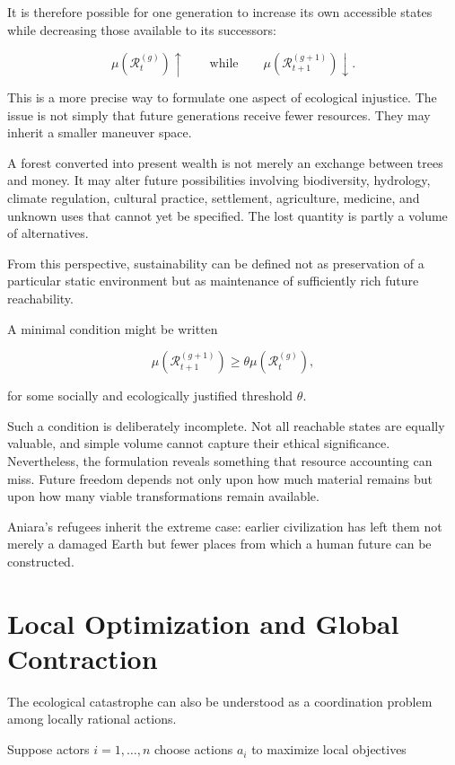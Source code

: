 \documentclass[11pt,oneside]{book}
\theoremstyle{definition}
\theoremstyle{remark}
\newcommand{\R}{\mathcal{R}}
\begin{document}
It is therefore possible for one generation to increase its own accessible states while decreasing those available to its successors:

\[
\mu\!\left(
\R_t^{(g)}
\right)\uparrow
\qquad\text{while}\qquad
\mu\!\left(
\R_{t+1}^{(g+1)}
\right)\downarrow.
\]

This is a more precise way to formulate one aspect of ecological injustice. The issue is not simply that future generations receive fewer resources. They may inherit a smaller maneuver space.

A forest converted into present wealth is not merely an exchange between trees and money. It may alter future possibilities involving biodiversity, hydrology, climate regulation, cultural practice, settlement, agriculture, medicine, and unknown uses that cannot yet be specified. The lost quantity is partly a volume of alternatives.

From this perspective, sustainability can be defined not as preservation of a particular static environment but as maintenance of sufficiently rich future reachability.

A minimal condition might be written

\[
\mu\!\left(
\R_{t+1}^{(g+1)}
\right)
\geq
\theta
\mu\!\left(
\R_t^{(g)}
\right),
\]

for some socially and ecologically justified threshold \(\theta\).

Such a condition is deliberately incomplete. Not all reachable states are equally valuable, and simple volume cannot capture their ethical significance. Nevertheless, the formulation reveals something that resource accounting can miss. Future freedom depends not only upon how much material remains but upon how many viable transformations remain available.

Aniara's refugees inherit the extreme case: earlier civilization has left them not merely a damaged Earth but fewer places from which a human future can be constructed.

\section{Local Optimization and Global Contraction}

The ecological catastrophe can also be understood as a coordination problem among locally rational actions.

Suppose actors \(i=1,\ldots,n\) choose actions \(a_i\) to maximize local objectives
\end{document}
